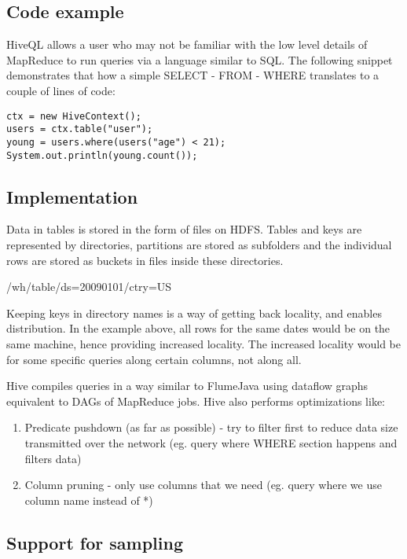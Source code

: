 \documentclass[twoside]{article}
\begin{document}
\subsection{Code example}

HiveQL allows a user who may not be familiar with the low level details of MapReduce to run queries via a language similar to SQL. The following snippet demonstrates that how a simple SELECT - FROM - WHERE translates to a couple of lines of code:

\texttt{ctx = new HiveContext(); \\
users = ctx.table("user"); \\
young = users.where(users("age") < 21); \\
System.out.println(young.count());}

\subsection{Implementation}

Data in tables is stored in the form of files on HDFS. Tables and keys are represented by directories, partitions are stored as subfolders and the individual rows are stored as buckets in files inside these directories.

/wh/table/ds=20090101/ctry=US

Keeping keys in directory names is a way of getting back locality, and enables distribution. In the example above, all rows for the same dates would be on the same machine, hence providing increased locality. The increased locality would be for some specific queries along certain columns, not along all.

Hive compiles queries in a way similar to FlumeJava using dataflow graphs equivalent to DAGs of MapReduce jobs. Hive also performs optimizations like:
\begin{enumerate}
    \item Predicate pushdown (as far as possible) - try to filter first to reduce data size transmitted over the network (eg. query where WHERE section happens and filters data)
    \item Column pruning - only use columns that we need (eg. query where we use column name instead of *)
\end{enumerate}

\subsection{Support for sampling}
\end{document}
